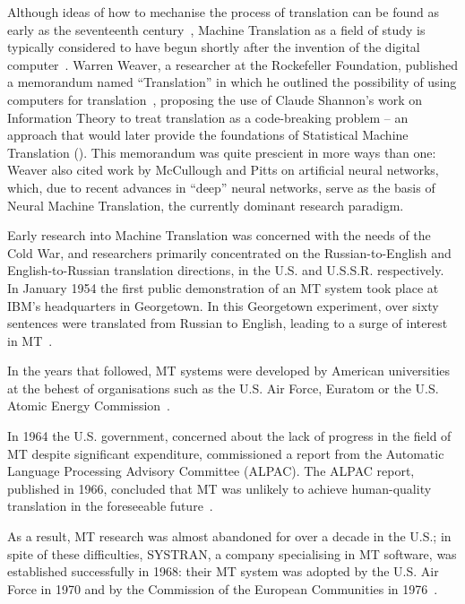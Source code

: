 Although ideas of how to mechanise the process of translation can be found as early as the seventeenth 
century~\citep[chap. 1]{hutchins1986machine}, Machine Translation as a field of study is typically
considered to have begun shortly after the invention of the digital 
computer~\citep[chap. 1]{koehn2010statistical}. Warren Weaver, a researcher at the Rockefeller Foundation, 
published a memorandum named ``Translation'' in which he outlined the possibility of using computers for 
translation~\citep{hutchins2004weaver}, proposing the use of Claude Shannon's work on Information Theory 
to treat translation as a code-breaking problem -- an approach that would later provide the foundations 
of Statistical Machine Translation (). This memorandum was quite prescient in 
more ways than one: Weaver also cited work by McCullough and Pitts on artificial neural networks, which, 
due to recent advances in ``deep'' neural networks, serve as the basis of Neural Machine Translation, 
the currently dominant research paradigm.

Early research into Machine Translation was concerned with the needs of the Cold War, and researchers 
primarily concentrated on the Russian-to-English and English-to-Russian translation directions, in the 
U.S. and U.S.S.R. respectively. In January 1954 the first public demonstration of an MT system took place 
at IBM's headquarters in Georgetown. In this Georgetown experiment, over sixty sentences were translated 
from Russian to English, leading to a surge of interest in MT~\citep{hutchins2004georgetown}. 

In the years that followed, MT systems were developed by American universities at the behest of organisations such as the U.S. Air Force, Euratom or the U.S. Atomic Energy 
Commission~\citep[chap. 4]{hutchins1986machine}.

In 1964 the U.S. government, concerned about the lack of progress in the field of MT despite significant 
expenditure, commissioned a report from the Automatic Language Processing Advisory Committee (ALPAC). 
The ALPAC report, published in 1966, concluded that MT was unlikely to achieve human-quality translation 
in the foreseeable future~\citep[chap. 8.9]{hutchins1986machine}. 

As a result, MT research was almost abandoned for over a decade in the U.S.; in spite of these 
difficulties, SYSTRAN, a company specialising in MT software, was established successfully in 1968: 
their MT system was adopted by the U.S. Air Force in 1970 and by the Commission of the European 
Communities in 1976~\citep[chap. 12.1]{hutchins1986machine}.

